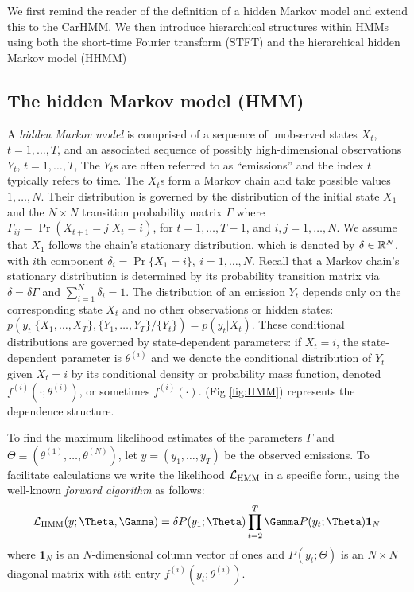 %



We first remind the reader of the definition of a hidden Markov model and extend this to the CarHMM. We then introduce hierarchical structures within HMMs using both the short-time Fourier transform (STFT) and the hierarchical hidden Markov model (HHMM)

\subsection{The hidden Markov model (HMM)}

A \textit{hidden Markov model}  is comprised of a sequence of  unobserved states $X_t$, $t = 1, \ldots, T$, and an associated sequence of  possibly high-dimensional observations $Y_t$, $t = 1, \ldots, T$,
The $Y_t$s are often referred to as ``emissions'' and the index $t$ typically refers to time. 
The $X_t$s form a Markov chain and take possible values $1, \ldots, N$. Their distribution is governed by the distribution of the initial state $X_1$ and the $N \times N$ transition probability matrix $\Gamma$ where $\Gamma_{ij} = \Pr(X_{t+1} = j | X_t = i)$, for $t=1,\ldots, T-1$, and $i, j = 1,\ldots, N$. 
%
We assume that $X_1$ follows the chain's stationary distribution, which is denoted by $\delta \in \mathbb{R}^N$, with $i$th component
$\delta_i = \Pr\{X_1 = i\},~ i = 1,\ldots,N.$
%
Recall that a Markov chain's stationary distribution is determined by its probability transition matrix via $\delta = \delta \Gamma$ and $\sum_{i=1}^N \delta_i = 1$.
%
The distribution of an emission $Y_t$ depends only on the corresponding state $X_t$ and no other observations or hidden states: $p\left(y_t|\{X_1,\ldots, X_T\},\{Y_1,\ldots, Y_T\}/ \{Y_t\}\right) = p(y_t|X_t)$.
%
These conditional distributions are governed by state-dependent parameters: if $X_t = i$, the state-dependent parameter is $\theta^{(i)}$ and we denote the conditional distribution of $Y_t$ given $X_t=i$ by its conditional density or probability mass function, denoted $f^{(i)}(\cdot ; \theta^{(i)})$, or sometimes  $f^{(i)}(\cdot)$.
%
(Fig \ref{fig:HMM}) represents the dependence structure.

To find the maximum likelihood estimates of the parameters $\Gamma$ and $\Theta \equiv (\theta^{(1)},\ldots,\theta^{(N)})$, let $y = (y_1,\ldots,y_T)$ be the observed emissions. 
 To facilitate calculations we write the likelihood $\mathcal{L}_{\text{HMM}}$ in a specific form, using the  well-known \textit{forward algorithm} \citep{Zucchini:2016} as follows:
%
$$\calL_{\text{HMM}}(y;\Theta,\Gamma) = \delta P(y_1;\Theta) \prod_{t=2}^T \Gamma P(y_t;\Theta) \mathbf{1}_N$$
%
where $\mathbf{1}_N$ is an $N$-dimensional column vector of ones and
%
$P(y_t;\Theta)$ is an $N \times N$ diagonal matrix with $ii$th entry  $f^{(i)}(y_t; \theta^{(i)})$.
%

